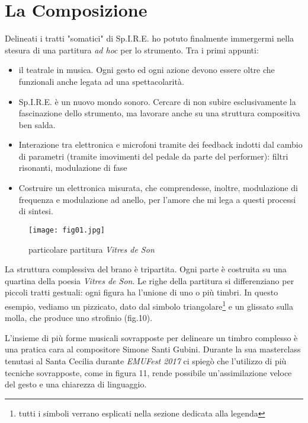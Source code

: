
\chapter{La Composizione}
\label{chp:La Composizione}

Delineati i tratti "somatici" di Sp.I.R.E. ho potuto finalmente immergermi nella stesura di una partitura \textit{ad hoc} per lo strumento. Tra i primi appunti:

\begin{itemize}
\item{il teatrale in musica. Ogni gesto ed ogni azione devono essere oltre che funzionali anche legata ad una spettacolarità.}
\item{Sp.I.R.E. è un nuovo mondo sonoro. Cercare di non subire esclusivamente la fascinazione dello strumento, ma lavorare anche su una struttura compositiva ben salda.}
\item{Interazione tra elettronica e microfoni tramite dei feedback indotti dal cambio di parametri (tramite imovimenti del pedale da parte del performer): filtri risonanti, modulazione di fase}
\item{Costruire un elettronica misurata, che comprendesse, inoltre, modulazione di frequenza e modulazione ad anello, per l'amore che mi lega a questi processi di sintesi.}
\end{itemize}

\begin{wrapfigure}{r}{5cm}
\centering
\texttt{[image: fig01.jpg]}
\caption{particolare partitura \textit{Vitres de Son}}
\label{default}
\end{wrapfigure}

La struttura complessiva del brano è tripartita. Ogni parte è costruita su una quartina della poesia \textit{Vitres de Son}. Le righe della partitura si differenziano per piccoli tratti gestuali: ogni figura ha l'unione di uno o più timbri. In questo esempio, vediamo un pizzicato, dato dal simbolo triangolare\footnote{tutti i simboli verrano esplicati nella sezione dedicata alla legenda} e un glissato sulla molla, che produce uno strofinio (fig.10). 

L'insieme di più forme musicali sovrapposte per delineare un timbro complesso è una pratica cara al compositore Simone Santi Gubini. Durante la sua masterclass tenutasi al Santa Cecilia durante \textit{EMUFest 2017} ci spiegò che l'utilizzo di più tecniche sovrapposte, come in figura 11, rende possibile un'assimilazione veloce del gesto e una chiarezza di linguaggio. 

